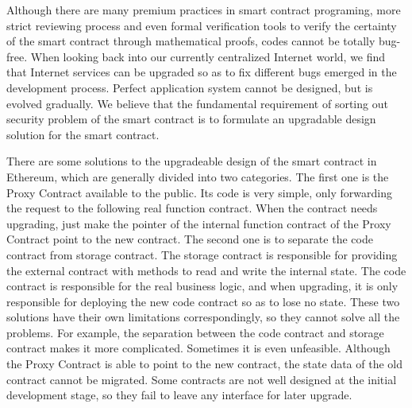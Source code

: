 Although there are many premium practices in smart contract programing, more strict reviewing process and even formal verification tools to verify the certainty of the smart contract through mathematical proofs, codes cannot be totally bug-free. When looking back into our currently centralized Internet world, we find that Internet services can be upgraded so as to fix different bugs emerged in the development process. Perfect application system cannot be designed, but is evolved gradually. We believe that the fundamental requirement of sorting out security problem of the smart contract is to formulate an upgradable design solution for the smart contract.


There are some solutions to the upgradeable design of the smart contract in Ethereum, which are generally divided into two categories. The first one is the Proxy Contract available to the public. Its code is very simple, only forwarding the request to the following real function contract. When the contract needs upgrading, just make the pointer of the internal function contract of the Proxy Contract point to the new contract. The second one is to separate the code contract from storage contract. The storage contract is responsible for providing the external contract with methods to read and write the internal state. The code contract is responsible for the real business logic, and when upgrading, it is only responsible for deploying the new code contract so as to lose no state. These two solutions have their own limitations correspondingly, so they cannot solve all the problems. For example, the separation between the code contract and storage contract makes it more complicated. Sometimes it is even unfeasible. Although the Proxy Contract is able to point to the new contract, the state data of the old contract cannot be migrated. Some contracts are not well designed at the initial development stage, so they fail to leave any interface for later upgrade.


